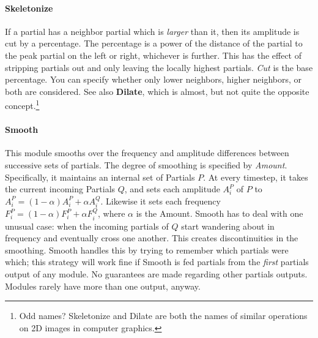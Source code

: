 \documentclass{article}
\begin{document}
\paragraph{Skeletonize} If a partial has a neighbor partial which is {\it larger} than it, then its amplitude is cut by a percentage.  The percentage is a power of the distance of the partial to the peak partial on the left or right, whichever is further.  This has the effect of stripping partials out and only leaving the locally highest partials.  {\it Cut} is the base percentage.  You can specify whether only lower neighbors, higher neighbors, or both are considered.  See also {\bf Dilate}, which is almost, but not quite the opposite concept.\footnote{Odd names?  Skeletonize and Dilate are both the names of similar operations on 2D images in computer graphics.}

\paragraph{Smooth} This module smooths over the frequency and amplitude differences between successive sets of partials.  The degree of smoothing is specified by {\it Amount}.  Specifically, it maintains an internal set of Partials \(P\).  At every timestep, it takes the current incoming Partials \(Q\), and sets each amplitude \(A^P_i\) of \(P\) to \(A^P_i = (1-\alpha) A^P_i + \alpha A^Q_i\).  Likewise it sets each frequency \(F^P_i = (1-\alpha) F^P_i + \alpha F^Q_i\), where \(\alpha\) is the Amount.  Smooth has to deal with one unusual case: when the incoming partials of \(Q\) start wandering about in frequency and eventually cross one another.  This creates discontinuities in the smoothing.  Smooth handles this by trying to remember which partials were which; this strategy will work fine if Smooth is fed partials from the {\it first} partials output of any module.  No guarantees are made regarding other partials outputs.  Modules rarely have more than one output, anyway.

\end{document}
